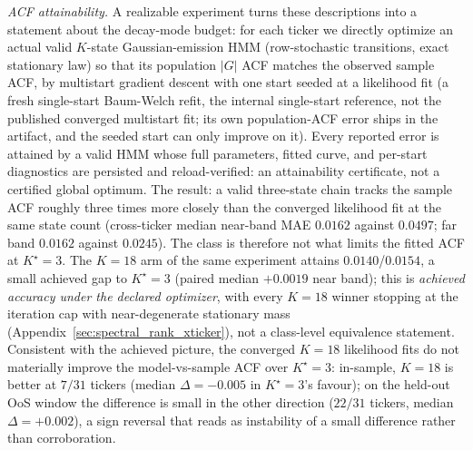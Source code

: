 \emph{ACF attainability.} A realizable experiment turns these descriptions into a statement about the decay-mode budget: for each ticker we directly optimize an actual valid $K$-state Gaussian-emission HMM (row-stochastic transitions, exact stationary law) so that its population $|G|$ ACF matches the observed sample ACF, by multistart gradient descent with one start seeded at a likelihood fit (a fresh single-start Baum-Welch refit, the internal single-start reference, not the published converged multistart fit; its own population-ACF error ships in the artifact, and the seeded start can only improve on it). Every reported error is attained by a valid HMM whose full parameters, fitted curve, and per-start diagnostics are persisted and reload-verified: an attainability certificate, not a certified global optimum. The result: a valid three-state chain tracks the sample ACF roughly three times more closely than the converged likelihood fit at the same state count (cross-ticker median near-band MAE $0.0162$ against $0.0497$; far band $0.0162$ against $0.0245$). The class is therefore not what limits the fitted ACF at $K^\star = 3$. The $K = 18$ arm of the same experiment attains $0.0140$/$0.0154$, a small achieved gap to $K^\star = 3$ (paired median $+0.0019$ near band); this is \emph{achieved accuracy under the declared optimizer}, with every $K = 18$ winner stopping at the iteration cap with near-degenerate stationary mass (Appendix~\ref{sec:spectral_rank_xticker}), not a class-level equivalence statement. Consistent with the achieved picture, the converged $K = 18$ likelihood fits do not materially improve the model-vs-sample ACF over $K^\star = 3$: in-sample, $K = 18$ is better at $7/31$ tickers (median $\Delta = -0.005$ in $K^\star = 3$'s favour); on the held-out OoS window the difference is small in the other direction ($22/31$ tickers, median $\Delta = +0.002$), a sign reversal that reads as instability of a small difference rather than corroboration.

